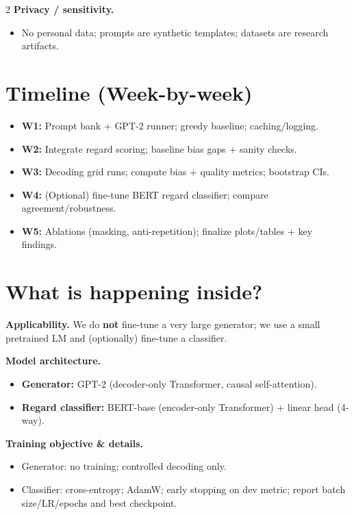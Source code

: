 \documentclass[10pt]{article}
\begin{document}
\begin{multicols}{2}
\textbf{Privacy / sensitivity.}
\begin{itemize}
  \item No personal data; prompts are synthetic templates; datasets are research artifacts.
\end{itemize}

\section*{Timeline (Week-by-week)}
\begin{itemize}
  \item \textbf{W1:} Prompt bank + GPT-2 runner; greedy baseline; caching/logging.
  \item \textbf{W2:} Integrate regard scoring; baseline bias gaps + sanity checks.
  \item \textbf{W3:} Decoding grid runs; compute bias + quality metrics; bootstrap CIs.
  \item \textbf{W4:} (Optional) fine-tune BERT regard classifier; compare agreement/robustness.
  \item \textbf{W5:} Ablations (masking, anti-repetition); finalize plots/tables + key findings.
\end{itemize}

\section*{What is happening inside?}
\textbf{Applicability.} We do \textbf{not} fine-tune a very large generator; we use a small pretrained LM and (optionally) fine-tune a classifier.

\textbf{Model architecture.}
\begin{itemize}
  \item \textbf{Generator:} GPT-2 (decoder-only Transformer, causal self-attention).
  \item \textbf{Regard classifier:} BERT-base (encoder-only Transformer) + linear head (4-way).
\end{itemize}

\textbf{Training objective \& details.}
\begin{itemize}
  \item Generator: no training; controlled decoding only.
  \item Classifier: cross-entropy; AdamW; early stopping on dev metric; report batch size/LR/epochs and best checkpoint.
\end{itemize}


\end{multicols}
\end{document}
